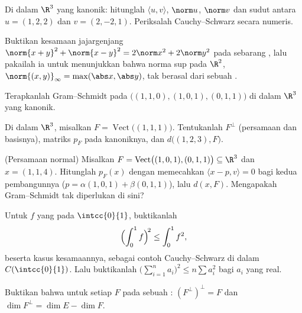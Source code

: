\begin{exercise}[$\star$]\label{exo:b1:euclid:1}
Di dalam $\R^3$ yang kanonik: hitunglah $\langle u, v\rangle$, $\norm u$,
$\norm v$ dan sudut antara $u = (1, 2, 2)$ dan $v = (2, -2,
1)$. Periksalah Cauchy--Schwarz secara numeris.
\end{exercise}

\begin{exercise}[$\star$]\label{exo:b1:euclid:2}
Buktikan kesamaan jajargenjang $\norm{x+y}^2 + \norm{x-y}^2 =
2\norm x^2 + 2\norm y^2$ pada sebarang , lalu pakailah ia untuk menunjukkan
bahwa norma sup pada $\R^2$, $\norm{(x,y)}_\infty = \max(\abs x,
\abs y)$, tak berasal dari sebuah .
\end{exercise}

\begin{exercise}[$\star$]\label{exo:b1:euclid:3}
Terapkanlah Gram--Schmidt pada $\bigl((1,1,0), (1,0,1), (0,1,1)\bigr)$ di dalam
$\R^3$ yang kanonik.
\end{exercise}

\begin{exercise}[$\star$]\label{exo:b1:euclid:4}
Di dalam $\R^3$, misalkan $F = \operatorname{Vect}\bigl((1,1,1)\bigr)$.
Tentukanlah $F^\perp$ (persamaan dan basisnya), matriks $p_F$ pada
 kanoniknya, dan $d\bigl((1, 2, 3), F\bigr)$.
\end{exercise}

\begin{exercise}[$\star\star$]\label{exo:b1:euclid:5}
(Persamaan normal) Misalkan $F =
\operatorname{Vect}\bigl((1,0,1),(0,1,1)\bigr) \subseteq \R^3$ dan
$x = (1, 1, 4)$. Hitunglah $p_F(x)$ dengan memecahkan $\langle x - p, v
\rangle = 0$ bagi kedua pembangunnya ($p = \alpha(1,0,1) +
\beta(0,1,1)$), lalu $d(x, F)$. Mengapakah Gram--Schmidt tak diperlukan
di sini?
\end{exercise}

\begin{exercise}[$\star\star$]\label{exo:b1:euclid:6}
Untuk $f$ yang  pada $\intcc{0}{1}$, buktikanlah
\[
\Bigl(\int_0^1 f\Bigr)^{\!2} \leq \int_0^1 f^2 ,
\]
beserta kasus kesamaannya, sebagai contoh Cauchy--Schwarz di dalam
$C(\intcc{0}{1})$. Lalu buktikanlah $\bigl(\sum_{i=1}^n a_i\bigr)^2 \leq
n \sum a_i^2$ bagi $a_i$ yang real.
\end{exercise}

\begin{exercise}[$\star\star$]\label{exo:b1:euclid:7}
Buktikan bahwa untuk setiap  $F$ pada sebuah :
$(F^{\perp})^{\perp} = F$ dan $\dim F^{\perp} = \dim E - \dim F$.
\end{exercise}

